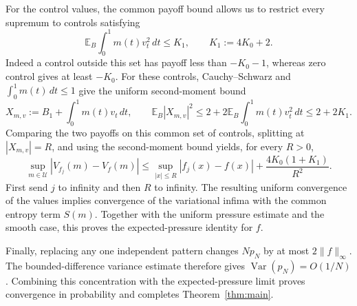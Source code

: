 \documentclass[11pt]{article}
\newcommand{\E}{\mathbb E}
\newcommand{\U}{\mathcal U}
\begin{document}
For the control values, the common payoff bound allows us to restrict every
supremum to controls satisfying
\[
 \E_B\int_0^1m(t)v_t^2\,dt\le K_1,
 \qquad K_1:=4K_0+2.
\]
Indeed a control outside this set has payoff less than $-K_0-1$, whereas zero
control gives at least $-K_0$. For these controls, Cauchy--Schwarz and
$\int_0^1m(t)\,dt\le1$ give the uniform second-moment bound
\[
 X_{m,v}:=B_1+\int_0^1m(t)v_t\,dt,
 \qquad
 \E_B|X_{m,v}|^2
 \le 2+2\E_B\int_0^1m(t)v_t^2\,dt
 \le 2+2K_1.
\]
Comparing the two payoffs on this common set of controls, splitting at
$|X_{m,v}|=R$, and using the second-moment bound yields, for every $R>0$,
\[
 \sup_{m\in\U}|V_{f_j}(m)-V_f(m)|
 \le \sup_{|x|\le R}|f_j(x)-f(x)|
       +\frac{4K_0(1+K_1)}{R^2}.
\]
First send $j$ to infinity and then $R$ to infinity. The resulting uniform
convergence of the values implies convergence of the variational infima with
the common entropy term $S(m)$. Together with the uniform pressure estimate
and the smooth case, this proves the expected-pressure identity for $f$.

Finally, replacing any one independent pattern changes $N p_N$ by at most
$2\|f\|_\infty$. The bounded-difference variance estimate therefore gives
$\operatorname{Var}(p_N)=O(1/N)$. Combining this concentration with the
expected-pressure limit proves convergence in probability and completes
Theorem~\ref{thm:main}.



\end{document}
